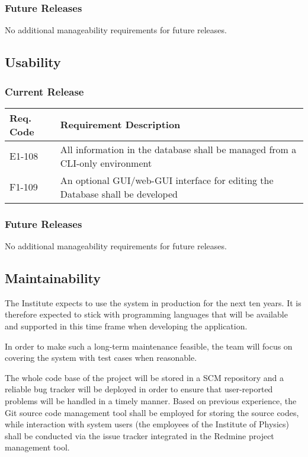 \documentclass[12pt]{article}
\begin{document}
\subsubsection{Future Releases}
No additional manageability requirements for future releases.


\subsection{Usability}

\subsubsection{Current Release}

\begin{center}
	\begin{tabular}{| p{2.5cm} | p{12.5cm} |}
		\hline
		\textbf{Req. Code} & \textbf{Requirement Description}\\
		\hline
		E1-108	& All information in the database shall be managed from a CLI-only environment\\
		\hline
        F1-109  & An optional GUI/web-GUI interface for editing the Database shall be developed\\
        \hline
	\end{tabular}
	\label{tab:UsabilityRequirements}
\end{center}

\subsubsection{Future Releases}
No additional manageability requirements for future releases.


\subsection{Maintainability}

The Institute expects to use the system in production for the next ten years.
It is therefore expected to stick with programming languages that will be
available and supported in this time frame when developing the application.

In order to make such a long-term maintenance feasible, the team will focus on
covering the system with test cases when reasonable.

The whole code base of the project will be stored in a SCM repository and a
reliable bug tracker will be deployed in order to ensure that user-reported
problems will be handled in a timely manner.  Based on previous experience, the
Git source code management tool shall be employed for storing the source codes,
while interaction with system users (the employees of the Institute of Physics)
shall be conducted via the issue tracker integrated in the Redmine project management tool.
\end{document}
